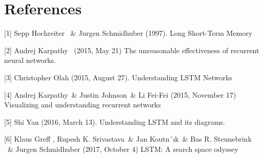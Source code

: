 \documentclass{article}
\begin{document}
\section*{References}
{
\small

[1] Sepp Hochreiter \ \& Jurgen Schmidhuber (1997). Long Short-Term Memory

[2] Andrej Karpathy \ (2015, May 21) The unreasonable effectiveness of recurrent neural networks. 

[3] Christopher Olah (2015, August 27). Understanding LSTM Networks

[4] Andrej Karpathy\ \& Justin Johnson\ \& Li Fei-Fei (2015, November 17) Visualizing and understanding recurrent networks

[5] Shi Yan (2016, March 13). Understanding LSTM and its diagrams.

[6] Klaus Greff , Rupesh K. Srivastava\ \& Jan Koutn´ık\ \& Bas R. Steunebrink \ \& Jurgen Schmidhuber (2017, October 4) LSTM: A search space odyssey

}


\end{document}
